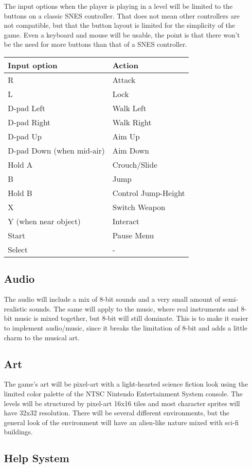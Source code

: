 \documentclass[12pt]{article}
\begin{document}
The input options when the player is playing in a level will be limited to the buttons on a classic SNES controller. That does not mean other controllers are not compatible, but that the button layout is limited for the simplicity of the game. Even a keyboard and mouse will be usable, the point is that there won't be the need for more buttons than that of a SNES controller. 

\begin{center}
\begin{tabular}{ | l | l | }
 \hline
 \textbf{Input option} & \textbf{Action} \\
 \hline
 R & Attack \\  
 \hline 
 L & Lock \\
 \hline
 D-pad Left & Walk Left \\
 \hline
 D-pad Right & Walk Right \\
 \hline
 D-pad Up & Aim Up \\
 \hline
 D-pad Down (when mid-air) & Aim Down \\
 \hline
 Hold A & Crouch/Slide \\
 \hline
 B & Jump \\
 \hline
 Hold B & Control Jump-Height\\
 \hline
 X & Switch Weapon \\
 \hline
  Y (when near object) & Interact \\
 \hline
 Start & Pause Menu \\
 \hline
 Select & - \\
 \hline
\end{tabular}
\end{center}

\subsection{Audio}

The audio will include a mix of 8-bit sounds and a very small amount of semi-realistic sounds. The same will apply to the music, where real instruments and 8-bit music is mixed together, but 8-bit will still dominate. This is to make it easier to implement audio/music, since it breaks the limitation of 8-bit and adds a little charm to the musical art. 

\subsection{Art}

The game's art will be pixel-art with a light-hearted science fiction look using the limited color palette of the NTSC Nintendo Entertainment System console. The levels will be structured by pixel-art 16x16 tiles and most character sprites will have 32x32 resolution. There will be several different environments, but the general look of the environment will have an alien-like nature mixed with sci-fi buildings. 

\subsection{Help System}
\end{document}
